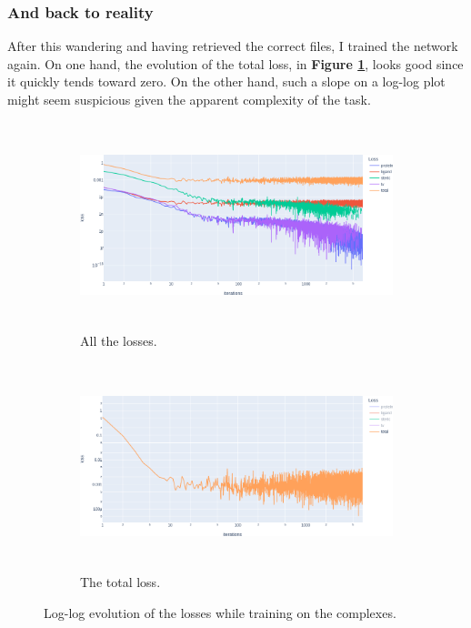 \documentclass{article}
\begin{document}
\subsubsection{And back to reality}
\label{sec:res-reality}
After this wandering and having retrieved the correct files, I trained the network again. On one hand, the evolution of the total loss, in \textbf{Figure \ref{fig:loss_complex-all}}, looks good since it quickly tends toward zero. On the other hand, such a slope on a log-log plot might seem suspicious given the apparent complexity of the task.
\begin{figure}[H]
    \centering
    \begin{subfigure}{.5\textwidth}
        \centering
        \includegraphics[height=6cm,width=\textwidth,keepaspectratio]{loss_complex-all.png}
        \caption{All the losses.}
        \label{fig:loss_complex-all}
    \end{subfigure}%
    \begin{subfigure}{.5\textwidth}
        \centering
        \includegraphics[height=6cm,width=\textwidth,keepaspectratio]{loss_complex.png}
        \caption{The total loss.}
        \label{fig:loss_complex-tot}
    \end{subfigure}
    \caption{Log-log evolution of the losses while training on the complexes.}
    \label{fig:loss_complex}
\end{figure}
\end{document}
